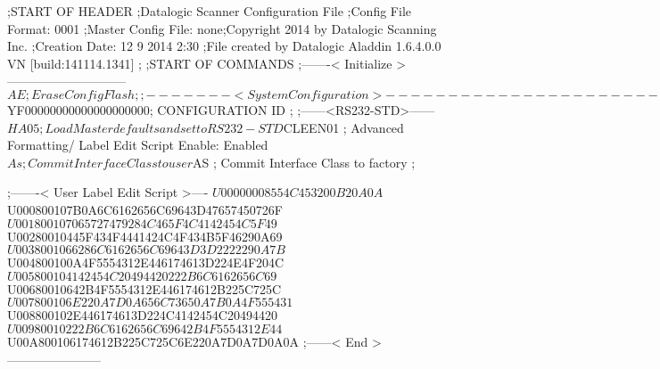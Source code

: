 ;START OF HEADER
;Datalogic Scanner Configuration File
;Config File Format: 0001
;Master Config File: none;Copyright 2014 by Datalogic Scanning Inc.
;Creation Date: 12 9 2014 2:30
;File created by Datalogic Aladdin 1.6.4.0.0 VN [build:141114.1341]
;
;START OF COMMANDS
;-------< Initialize >-----------------------------
$AE                 ; Erase Config Flash
;
;-------< System Configuration >-------------------------------
$YF00000000000000000000; CONFIGURATION ID
;
;------<RS232-STD>------
$HA05               ; Load Master defaults and set to RS232-STD
$CLEEN01            ; Advanced Formatting/ Label Edit Script Enable: Enabled
$As                 ; Commit Interface Class to user
$AS                 ; Commit Interface Class to factory
;

;-------< User Label Edit Script >----
$U00000008554C453200B20A0A
$U000800107B0A6C6162656C69643D47657450726F
$U001800107065727479284C465F4C4142454C5F49
$U00280010445F434F4441424C4F434B5F46290A69
$U0038001066286C6162656C69643D3D2222290A7B
$U004800100A4F5554312E446174613D224E4F204C
$U005800104142454C20494420222B6C6162656C69
$U00680010642B4F5554312E446174612B225C725C
$U007800106E220A7D0A656C73650A7B0A4F555431
$U008800102E446174613D224C4142454C20494420
$U00980010222B6C6162656C69642B4F5554312E44
$U00A800106174612B225C725C6E220A7D0A7D0A0A
;------< End >-----------------------

